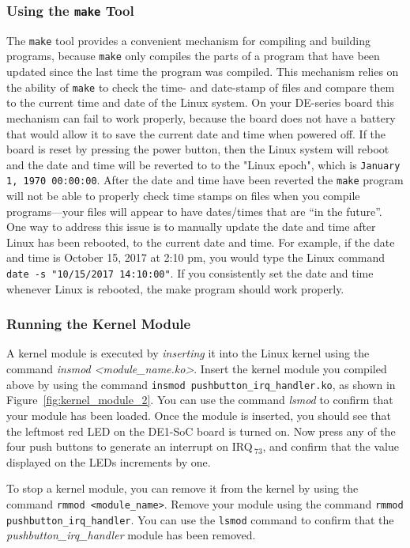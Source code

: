 \documentclass[11pt, twoside, pdftex]{article}
\begin{document}
\subsubsection{Using the \texttt{make} Tool}

The \texttt{make} tool provides a convenient mechanism for compiling and building programs,
because \texttt{make} only compiles the parts of a program that have been updated since the 
last time the program was compiled. This mechanism relies on the ability of \texttt{make} 
to check the time- and date-stamp of files and compare them to the current time and date of
the Linux system. On your DE-series board this mechanism can fail to work properly, because the 
board does not have a battery that would allow it to save the current date and time when 
powered off. If the board is reset by pressing the power button, then the Linux system 
will reboot and the date and time will be reverted to to the "Linux epoch", which is 
\texttt{January 1, 1970 00:00:00}. After the date and time have been reverted
the \texttt{make} program will not be able to properly check time 
stamps on files when you compile programs---your files will appear to have dates/times that
are ``in the future''. One way to address this issue is to manually update the date and time
after  Linux has been rebooted, to the current date and time. For example, if the date and time 
is October 15, 2017 at 2:10 pm, you would type the Linux command 
\texttt{date -s "10/15/2017 14:10:00"}. If you consistently set the date and time whenever
Linux is rebooted, the make program should work properly.

\subsubsection{Running the Kernel Module}

A kernel module is executed by {\it inserting} it into the Linux kernel using the command
{\it insmod <module\_name.ko>}. Insert the kernel module you compiled above by
using the command \texttt{insmod pushbutton\_irq\_handler.ko}, as shown in
Figure~\ref{fig:kernel_module_2}. You can use the command {\it lsmod} to confirm that 
your module has been loaded. Once the module is inserted, you should see that the leftmost
red LED on the DE1-SoC board is turned on. Now press any of the four push buttons to generate 
an interrupt on IRQ$\,_{73}$, and confirm that the value displayed on the LEDs increments by one. 

To stop a kernel module, you can remove it from the kernel by using the command
\texttt{rmmod <module\_name>}. Remove your module using the command \texttt{rmmod
pushbutton\_irq\_handler}. You can use the \texttt{lsmod} command to confirm that 
the \textit{pushbutton\_irq\_handler} module has been removed.
\end{document}
